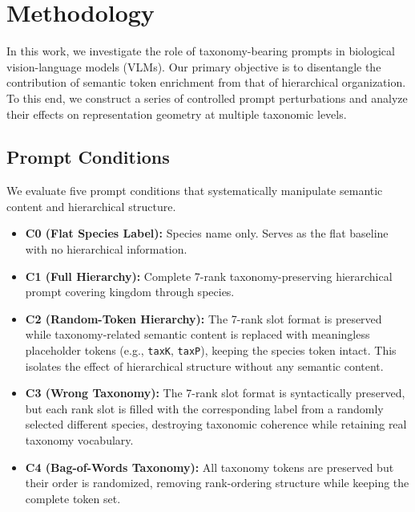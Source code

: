 \section{Methodology}
\label{sec:method}

In this work, we investigate the role of taxonomy-bearing prompts in biological vision-language models (VLMs). Our primary objective is to disentangle the contribution of semantic token enrichment from that of hierarchical organization. To this end, we construct a series of controlled prompt perturbations and analyze their effects on representation geometry at multiple taxonomic levels.

\subsection{Prompt Conditions}

We evaluate five prompt conditions that systematically manipulate semantic content and hierarchical structure.

\begin{itemize}
    \item \textbf{C0 (Flat Species Label):} Species name only. Serves as the flat baseline with no hierarchical information.

    \item \textbf{C1 (Full Hierarchy):} Complete 7-rank taxonomy-preserving hierarchical prompt covering kingdom through species.

    \item \textbf{C2 (Random-Token Hierarchy):} The 7-rank slot format is preserved while taxonomy-related semantic content is replaced with meaningless placeholder tokens (e.g., \texttt{taxK}, \texttt{taxP}), keeping the species token intact. This isolates the effect of hierarchical structure without any semantic content.

    \item \textbf{C3 (Wrong Taxonomy):} The 7-rank slot format is syntactically preserved, but each rank slot is filled with the corresponding label from a randomly selected different species, destroying taxonomic coherence while retaining real taxonomy vocabulary.

    \item \textbf{C4 (Bag-of-Words Taxonomy):} All taxonomy tokens are preserved but their order is randomized, removing rank-ordering structure while keeping the complete token set.

\end{itemize}

